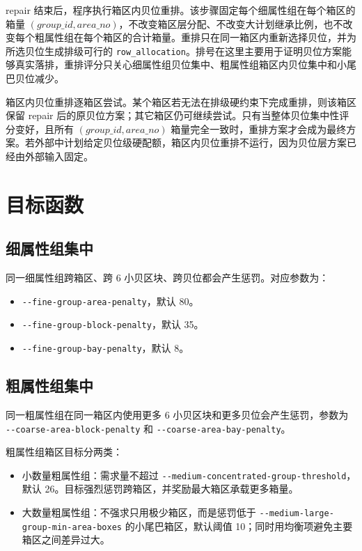 \documentclass[UTF8,a4paper,11pt]{ctexart}
\newcommand{\code}[1]{\nolinkurl{#1}}
\begin{document}
repair 结束后，程序执行箱区内贝位重排。该步骤固定每个细属性组在每个箱区的箱量 \((group\_id, area\_no)\)，不改变箱区层分配、不改变大计划继承比例，也不改变每个粗属性组在每个箱区的合计箱量。重排只在同一箱区内重新选择贝位，并为所选贝位生成排级可行的 \code{row_allocation}。排号在这里主要用于证明贝位方案能够真实落排，重排评分只关心细属性组贝位集中、粗属性组箱区内贝位集中和小尾巴贝位减少。

箱区内贝位重排逐箱区尝试。某个箱区若无法在排级硬约束下完成重排，则该箱区保留 repair 后的原贝位方案；其它箱区仍可继续尝试。只有当整体贝位集中性评分变好，且所有 \((group\_id, area\_no)\) 箱量完全一致时，重排方案才会成为最终方案。若外部中计划给定贝位级硬配额，箱区内贝位重排不运行，因为贝位层方案已经由外部输入固定。

\section{目标函数}

\subsection{细属性组集中}

同一细属性组跨箱区、跨 6 小贝区块、跨贝位都会产生惩罚。对应参数为：
\begin{itemize}
  \item \code{--fine-group-area-penalty}，默认 80。
  \item \code{--fine-group-block-penalty}，默认 35。
  \item \code{--fine-group-bay-penalty}，默认 8。
\end{itemize}

\subsection{粗属性组集中}

同一粗属性组在同一箱区内使用更多 6 小贝区块和更多贝位会产生惩罚，参数为 \code{--coarse-area-block-penalty} 和 \code{--coarse-area-bay-penalty}。

粗属性组箱区目标分两类：
\begin{itemize}
  \item 小数量粗属性组：需求量不超过 \code{--medium-concentrated-group-threshold}，默认 26。目标强烈惩罚跨箱区，并奖励最大箱区承载更多箱量。
  \item 大数量粗属性组：不强求只用极少箱区，而是惩罚低于 \code{--medium-large-group-min-area-boxes} 的小尾巴箱区，默认阈值 10；同时用均衡项避免主要箱区之间差异过大。
\end{itemize}
\end{document}
